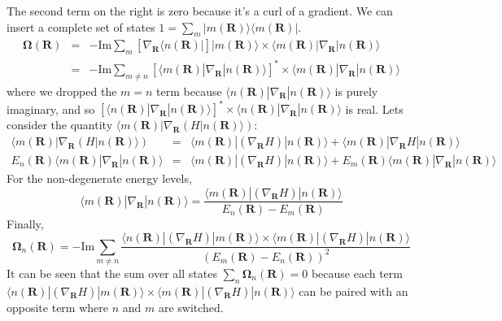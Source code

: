 \documentclass[a4paper,12pt]{article}
\renewcommand{\vec}[1]{\boldsymbol{\mathbf{#1}}}
\begin{document}
The second term on the right is zero because it's a curl of a gradient.  We can insert a complete set of states $1 = \sum_m | m(\vec{R}) \rangle \langle m(\vec{R}) |$.
\begin{eqnarray}
\vec{\Omega}(\vec{R}) &=& -\text{Im} \sum_m \left[ \nabla_{\vec{R}} \langle n(\vec{R}) | \right] | m(\vec{R}) \rangle \times \langle m(\vec{R}) | \nabla_{\vec{R}} | n(\vec{R}) \rangle \\
&=& -\text{Im} \sum_{m \ne n} \left[ \langle m(\vec{R}) | \nabla_{\vec{R}} | n(\vec{R}) \rangle \right]^* \times \langle m(\vec{R}) | \nabla_{\vec{R}} | n(\vec{R}) \rangle
\end{eqnarray}
where we dropped the $m = n$ term because $\langle n(\vec{R}) | \nabla_{\vec{R}} | n(\vec{R}) \rangle$ is purely imaginary, and so $\left[ \langle n(\vec{R}) | \nabla_{\vec{R}} | n(\vec{R}) \rangle \right]^* \times \langle n(\vec{R}) | \nabla_{\vec{R}} | n(\vec{R}) \rangle$ is real. Lets consider the quantity $\langle m(\vec{R}) | \nabla_{\vec{R}} \left(H | n(\vec{R}) \rangle \right)$:
\begin{eqnarray}
\langle m(\vec{R}) | \nabla_{\vec{R}} \left(H | n(\vec{R}) \rangle \right) &=& \langle m(\vec{R}) | \left( \nabla_{\vec{R}} H \right) | n(\vec{R}) \rangle + \langle m(\vec{R}) | \nabla_{\vec{R}} H | n(\vec{R}) \rangle \\
E_n(\vec{R}) \langle m(\vec{R}) | \nabla_{\vec{R}} | n(\vec{R}) \rangle &=& \langle m(\vec{R}) | \left( \nabla_{\vec{R}} H \right) | n(\vec{R}) \rangle + E_m(\vec{R}) \langle m(\vec{R}) | \nabla_{\vec{R}} | n(\vec{R}) \rangle
\end{eqnarray}
For the non-degenerate energy levels,
\begin{equation}
\langle m(\vec{R}) | \nabla_{\vec{R}} | n(\vec{R}) \rangle = \frac{\langle m(\vec{R}) | \left( \nabla_{\vec{R}} H \right) | n(\vec{R}) \rangle}{E_n(\vec{R})-E_m(\vec{R})}
\end{equation}
Finally,
\begin{equation}\label{eq:curvature}
\vec{\Omega}_n(\vec{R}) = -\text{Im} \sum_{m \ne n}{\frac{\langle n(\vec{R}) | (\nabla_{\vec{R}} H) | m(\vec{R}) \rangle \times \langle m(\vec{R}) | (\nabla_{\vec{R}} H) | n(\vec{R}) \rangle}{(E_m(\vec{R})-E_n(\vec{R}))^2}}
\end{equation}
It can be seen that the sum over all states $\sum_n \vec{\Omega}_n(\vec{R}) = 0$ because each term $\langle n(\vec{R}) | (\nabla_{\vec{R}} H) | m(\vec{R}) \rangle \times \langle m(\vec{R}) | (\nabla_{\vec{R}} H) | n(\vec{R}) \rangle$ can be paired with an opposite term where $n$ and $m$ are switched.
\end{document}
